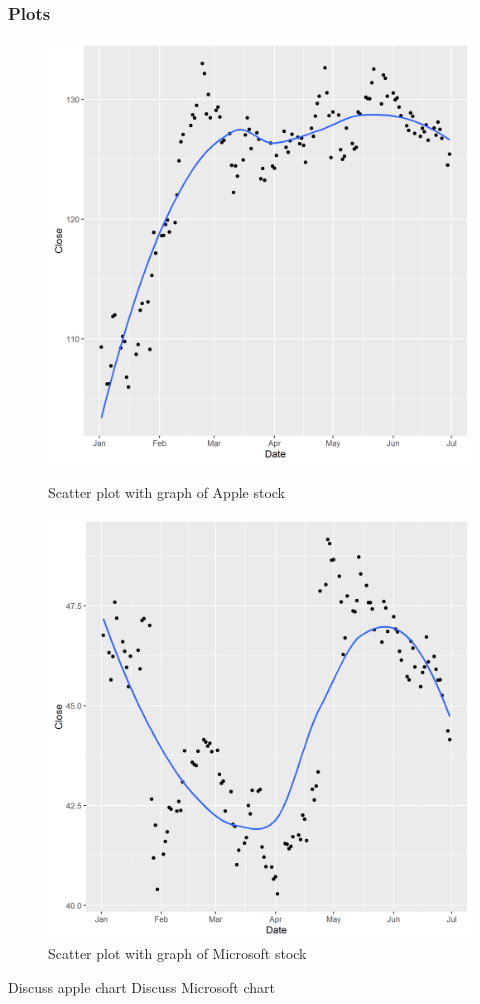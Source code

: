 \documentclass[paper=a4, fontsize=11pt]{scrartcl} %
\numberwithin{equation}{section} %
\numberwithin{figure}{section} %
\numberwithin{table}{section} %
\begin{document}
\subsubsection{Plots}
\begin{figure}[!htb]
  \includegraphics[width=\linewidth]{graph/AAPL9.png}
  \caption{Scatter plot with graph of Apple stock}
\endminipage\hfill
{}
  \includegraphics[width=\linewidth]{graph/MSFT9.png}
  \caption{Scatter plot with graph of Microsoft stock}
\endminipage\hfill

\end{figure}
Discuss apple chart
Discuss Microsoft chart
\end{document}
